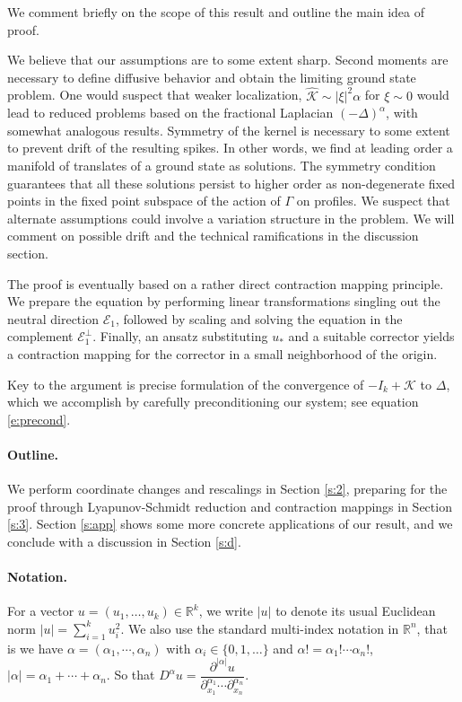 \documentclass[10pt]{article}
\newcommand{\R}{\mathbb{R}}
\newcommand{\K}{\mathcal{K}}
\begin{document}
We comment briefly on the scope of this result and outline the main idea of proof. 

We believe that our assumptions are to some extent sharp. Second moments are necessary to define diffusive behavior and obtain the limiting ground state problem. One would suspect that weaker localization, $\hat{\K}\sim |\xi|^2\alpha$ for $\xi\sim 0$ would lead to reduced problems based on the fractional Laplacian $(-\Delta)^\alpha$, with somewhat analogous results. Symmetry of the kernel is necessary to some extent to prevent drift of the resulting spikes. In other words, we find at leading order a manifold of translates of a ground state as solutions. The symmetry condition guarantees that all these solutions persist to higher order as non-degenerate fixed points in the fixed point subspace of the action of $\Gamma$ on profiles. We suspect that alternate assumptions could involve a variation structure in the problem. We will comment on possible drift and the technical ramifications in the discussion section.

The proof is eventually based on a rather direct contraction mapping principle. We prepare the equation by performing linear transformations singling out the neutral direction $\mathcal{E}_1$, followed by scaling and solving the equation in the complement $\mathcal{E}_1^\perp$. Finally, an ansatz substituting $u_*$ and a suitable corrector yields a contraction mapping for the corrector in a small neighborhood of the origin. 

Key to the argument is precise formulation of the convergence of $-I_k+\K$ to $\Delta$, which we accomplish by carefully preconditioning our system; see equation \eqref{e:precond}.


\paragraph{Outline.} We perform coordinate changes and rescalings in Section \ref{s:2}, preparing for the proof through Lyapunov-Schmidt reduction and contraction mappings in Section \ref{s:3}. Section \ref{s:app} shows some more concrete applications of our result, and we conclude with a discussion in Section \ref{s:d}.

\paragraph{Notation.}

For a vector $u=(u_1,\ldots,u_k) \in \R^k$, we write $|u|$ to denote its usual Euclidean norm $|u| = \sum_{i=1}^{k} u_i^2$. We also use the standard multi-index notation in $\R^n$, that is we have $\alpha = (\alpha_1,\cdots,\alpha_n)$ with $\alpha_i \in \{0,1,\ldots \}$ and $\alpha! = \alpha_1!\cdots\alpha_n!$, $|\alpha|=\alpha_1+\cdots+\alpha_n$. So that 
$D^\alpha u = \dfrac{\partial^{|\alpha |} u}{\partial_{x_1}^{\alpha_1}\cdots \partial_{x_n}^{\alpha_n}}$.
\end{document}
